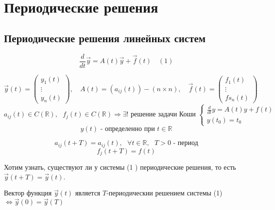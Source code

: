 \documentclass[12pt, a4paper]{report}
\begin{document}
\fi


\chapter{Периодические решения}

\section{Периодические решения линейных систем}

\[ \frac{d}{dt } \vec{y }  = A(t ) \vec{y } + \vec{f } (t ) \quad  (1) \] 

\[ \vec{y}  (t ) =\begin{pmatrix}
y_1(t)\\
\vdots\\
y_n(t)
\end{pmatrix}  ,\quad  A(t ) = ( a_{ij }(t)  ) - (n \times  n) , \quad \vec{f} (t ) =\begin{pmatrix}
    f_1(t)\\
    \vdots\\
    fs_n(t)
\end{pmatrix}  \] 
\[ a_{ij } (t ) \in C(\mathbb{R}) , \text{ } f_j (t ) \in  C(\mathbb{R} ) \Rightarrow \exists ! \text{ решение задачи Коши }  \begin{cases}
\displaystyle  \frac{d}{dt }  y = A (t ) y + f(t  ) \\
y(t_0 ) = t_0 
\end{cases} \]
\[ y(t )  \text{ - определенно при } t \in  \mathbb{R}\]   

\[ a_{ij }  (t+T      ) = a_{ij }  (t ) , \text{ }  \forall  t \in  \mathbb{R} , \text{ }  T > 0 \text{ - период}  \] 
\[ f_j (t + T ) = f(t)  \] 

Хотим узнать, существуют ли у системы (1 ) периодические решения, то есть \( \vec{y } (t+ T) = \vec{y } (t ) \).

\begin{theorem}
    Вектор функция \( \vec{y } (t ) \)  является \( T \)-периодическии решением системы (1) \( \Leftrightarrow  \vec{y } (0 ) = \vec{y }  (T)  \) 
\end{theorem}
\end{document}
